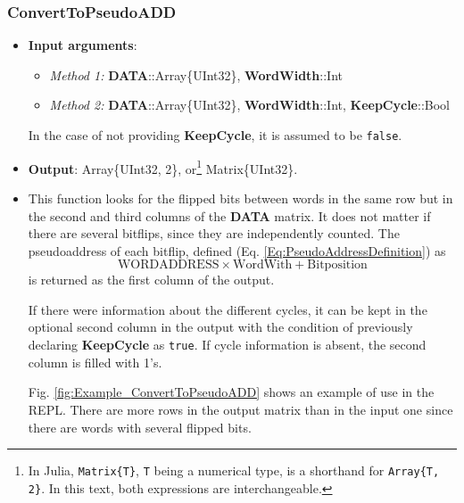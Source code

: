  \subsubsection*{ConvertToPseudoADD}\label{Func:ConvertToPseudoADD}
 \begin{itemize}
 	\item \textbf{Input arguments}: 
 	\begin{itemize}
 		\item \textit{Method 1: }\textbf{DATA}::Array\{UInt32\}, \textbf{WordWidth}::Int
 		\item \textit{Method 2: }\textbf{DATA}::Array\{UInt32\}, \textbf{WordWidth}::Int, \textbf{KeepCycle}::Bool
 	\end{itemize}
 
 	In the case of not providing \textbf{KeepCycle}, it is assumed to be \texttt{false}.
 
 	\item   \textbf{Output}: Array\{UInt32, 2\}, or\footnote{In Julia, \texttt{Matrix\{T\}}, \texttt{T} being a numerical type, is a shorthand for \texttt{Array\{T, 2\}}. In this text, both expressions are interchangeable.}  Matrix\{UInt32\}.
 	\item  This function looks for the flipped bits between words in the same row but in the second
 	and third columns of the \textbf{DATA} matrix. It does not matter if there are several bitflips, since they are independently counted. 
 	The pseudoaddress  of each bitflip, defined   (Eq. \ref{Eq:PseudoAddressDefinition}) as \[\text{WORDADDRESS}\times\text{WordWith}+\text{Bitposition}\] is returned as the first column of the output.
 
 	If there were information about the different cycles, it can be kept in the optional second column in the output with the condition of previously declaring \textbf{KeepCycle} as \texttt{true}. If cycle information is absent, the second column is filled with 1's.
 	
 	Fig. \ref{fig:Example_ConvertToPseudoADD} shows an example of use in the REPL. There are more rows in the output matrix than in the input one since there are words with several flipped bits.
 	

\end{itemize}
